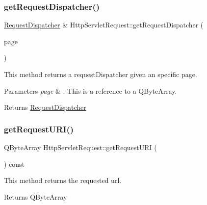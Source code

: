 \subsubsection{\texorpdfstring{get\+Request\+Dispatcher()}{getRequestDispatcher()}}
{\footnotesize\ttfamily \hyperlink{class_request_dispatcher}{Request\+Dispatcher} \& Http\+Servlet\+Request\+::get\+Request\+Dispatcher (\begin{DoxyParamCaption}\item[{const Q\+String \&}]{page }\end{DoxyParamCaption})}



This method returns a request\+Dispatcher given an specific page. 


\begin{DoxyParams}{Parameters}
{\em page} & \+: This is a reference to a Q\+Byte\+Array. \\
\hline
\end{DoxyParams}
\begin{DoxyReturn}{Returns}
\hyperlink{class_request_dispatcher}{Request\+Dispatcher} 
\end{DoxyReturn}
\mbox{\label{class_http_servlet_request_a788609a8520897ecaa91875a91b0e921}} 
\subsubsection{\texorpdfstring{get\+Request\+U\+R\+I()}{getRequestURI()}}
{\footnotesize\ttfamily Q\+Byte\+Array Http\+Servlet\+Request\+::get\+Request\+U\+RI (\begin{DoxyParamCaption}{ }\end{DoxyParamCaption}) const}



This method returns the requested url. 

\begin{DoxyReturn}{Returns}
Q\+Byte\+Array 
\end{DoxyReturn}
\mbox{\label{class_http_servlet_request_a81efdae7956ec53f0827da7ab39a7a4f}} 
